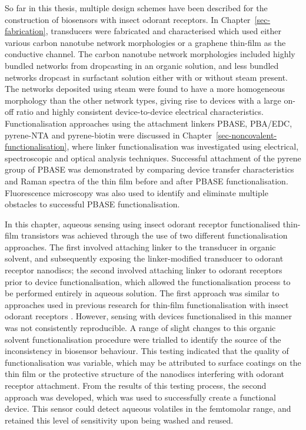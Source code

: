 \documentclass[
  a4paper,
]{scrbook}
\begin{document}
So far in this thesis, multiple design schemes have been described for
the construction of biosensors with insect odorant receptors. In
Chapter~\ref{sec-fabrication}, transducers were fabricated and
characterised which used either various carbon nanotube network
morphologies or a graphene thin-film as the conductive channel. The
carbon nanotube network morphologies included highly bundled networks
from dropcasting in an organic solution, and less bundled networks
dropcast in surfactant solution either with or without steam present.
The networks deposited using steam were found to have a more homogeneous
morphology than the other network types, giving rise to devices with a
large on-off ratio and highly consistent device-to-device electrical
characteristics. Functionalisation approaches using the attachment
linkers PBASE, PBA/EDC, pyrene-NTA and pyrene-biotin were discussed in
Chapter~\ref{sec-noncovalent-functionalisation}, where linker
functionalisation was investigated using electrical, spectroscopic and
optical analysis techniques. Successful attachment of the pyrene group
of PBASE was demonstrated by comparing device transfer characteristics
and Raman spectra of the thin film before and after PBASE
functionalisation. Fluorescence microscopy was also used to identify and
eliminate multiple obstacles to successful PBASE functionalisation.

In this chapter, aqueous sensing using insect odorant receptor
functionalised thin-film transistors was achieved through the use of two
different functionalisation approaches. The first involved attaching
linker to the transducer in organic solvent, and subsequently exposing
the linker-modified transducer to odorant receptor nanodiscs; the second
involved attaching linker to odorant receptors prior to device
functionalisation, which allowed the functionalisation process to be
performed entirely in aqueous solution. The first approach was similar
to approaches used in previous research for thin-film functionalisation
with insect odorant receptors \autocite{Murugathas2019a,Murugathas2020}.
However, sensing with devices functionalised in this manner was not
consistently reproducible. A range of slight changes to this organic
solvent functionalisation procedure were trialled to identify the source
of the inconsistency in biosensor behaviour. This testing indicated that
the quality of functionalisation was variable, which may be attributed
to surface coatings on the thin film or the protective structure of the
nanodiscs interfering with odorant receptor attachment. From the results
of this testing process, the second approach was developed, which was
used to successfully create a functional device. This sensor could
detect aqueous volatiles in the femtomolar range, and retained this
level of sensitivity upon being washed and reused.
\end{document}
